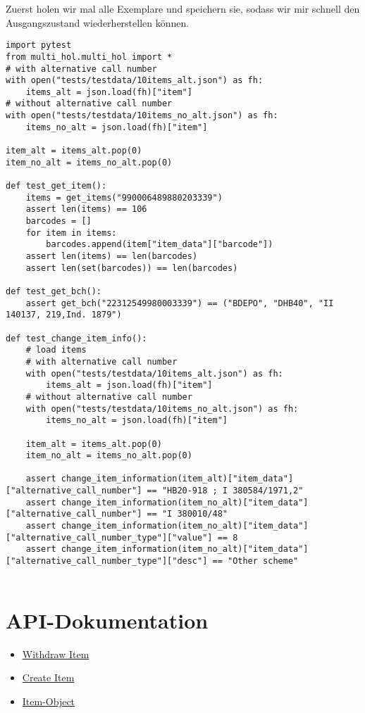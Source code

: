 \documentclass[10pt, a4paper]{scrartcl}
\begin{document}
Zuerst holen wir mal alle Exemplare und speichern sie, sodass wir mir
schnell den Ausgangszustand wiederherstellen können.

\begin{verbatim}
import pytest
from multi_hol.multi_hol import *
# with alternative call number
with open("tests/testdata/10items_alt.json") as fh:
    items_alt = json.load(fh)["item"]
# without alternative call number
with open("tests/testdata/10items_no_alt.json") as fh:
    items_no_alt = json.load(fh)["item"]

item_alt = items_alt.pop(0)
item_no_alt = items_no_alt.pop(0)

def test_get_item():
    items = get_items("990006489880203339")
    assert len(items) == 106
    barcodes = []
    for item in items:
        barcodes.append(item["item_data"]["barcode"])
    assert len(items) == len(barcodes)
    assert len(set(barcodes)) == len(barcodes)

def test_get_bch():
    assert get_bch("22312549980003339") == ("BDEPO", "DHB40", "II 140137, 219,Ind. 1879")

def test_change_item_info():
    # load items
    # with alternative call number
    with open("tests/testdata/10items_alt.json") as fh:
        items_alt = json.load(fh)["item"]
    # without alternative call number
    with open("tests/testdata/10items_no_alt.json") as fh:
        items_no_alt = json.load(fh)["item"]

    item_alt = items_alt.pop(0)
    item_no_alt = items_no_alt.pop(0)

    assert change_item_information(item_alt)["item_data"]["alternative_call_number"] == "HB20-918 ; I 380584/1971,2"
    assert change_item_information(item_no_alt)["item_data"]["alternative_call_number"] == "I 380010/48"
    assert change_item_information(item_no_alt)["item_data"]["alternative_call_number_type"]["value"] == 8
    assert change_item_information(item_no_alt)["item_data"]["alternative_call_number_type"]["desc"] == "Other scheme"


\end{verbatim}

\section{API-Dokumentation}
\label{sec:org5d3d8fa}
\begin{itemize}
\item \href{https://developers.exlibrisgroup.com/alma/apis/bibs/DELETE/gwPcGly021om4RTvtjbPleCklCGxeYAfEqJOcQOaLEvNcHQT0/ozqu3DGTurs/Xx+GZLELMQamEGJL0f6Mjkdw==/af2fb69d-64f4-42bc-bb05-d8a0ae56936e}{Withdraw Item}
\item \href{https://developers.exlibrisgroup.com/alma/apis/bibs/POST/gwPcGly021om4RTvtjbPleCklCGxeYAfEqJOcQOaLEvNcHQT0/ozqu3DGTurs/XxIP4LrexQUdc=/af2fb69d-64f4-42bc-bb05-d8a0ae56936e}{Create Item}
\item \href{https://developers.exlibrisgroup.com/alma/apis/xsd/rest\_item.xsd}{Item-Object}
\end{itemize}
\end{document}

